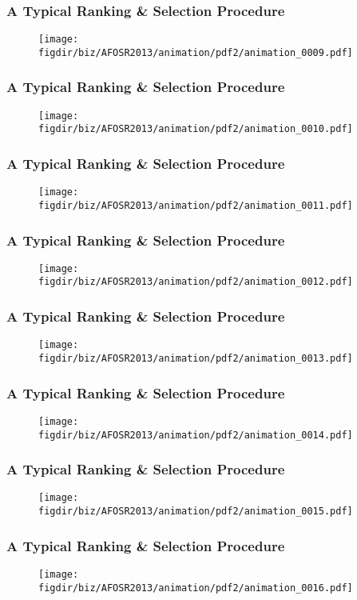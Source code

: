 \documentclass[13pt]{beamer}
\newcommand{\figdir}{../../fig}
\begin{document}
{\begin{frame}\frametitle{A Typical Ranking \& Selection Procedure}\begin{figure}\texttt{[image: \\figdir/biz/AFOSR2013/animation/pdf2/animation\_0009.pdf]}\end{figure}\end{frame}
\begin{frame}\frametitle{A Typical Ranking \& Selection Procedure}\begin{figure}\texttt{[image: \\figdir/biz/AFOSR2013/animation/pdf2/animation\_0010.pdf]}\end{figure}\end{frame}
\begin{frame}\frametitle{A Typical Ranking \& Selection Procedure}\begin{figure}\texttt{[image: \\figdir/biz/AFOSR2013/animation/pdf2/animation\_0011.pdf]}\end{figure}\end{frame}
\begin{frame}\frametitle{A Typical Ranking \& Selection Procedure}\begin{figure}\texttt{[image: \\figdir/biz/AFOSR2013/animation/pdf2/animation\_0012.pdf]}\end{figure}\end{frame}
\begin{frame}\frametitle{A Typical Ranking \& Selection Procedure}\begin{figure}\texttt{[image: \\figdir/biz/AFOSR2013/animation/pdf2/animation\_0013.pdf]}\end{figure}\end{frame}
\begin{frame}\frametitle{A Typical Ranking \& Selection Procedure}\begin{figure}\texttt{[image: \\figdir/biz/AFOSR2013/animation/pdf2/animation\_0014.pdf]}\end{figure}\end{frame}
\begin{frame}\frametitle{A Typical Ranking \& Selection Procedure}\begin{figure}\texttt{[image: \\figdir/biz/AFOSR2013/animation/pdf2/animation\_0015.pdf]}\end{figure}\end{frame}
\begin{frame}\frametitle{A Typical Ranking \& Selection Procedure}\begin{figure}\texttt{[image: \\figdir/biz/AFOSR2013/animation/pdf2/animation\_0016.pdf]}\end{figure}\end{frame}
}
\end{document}
